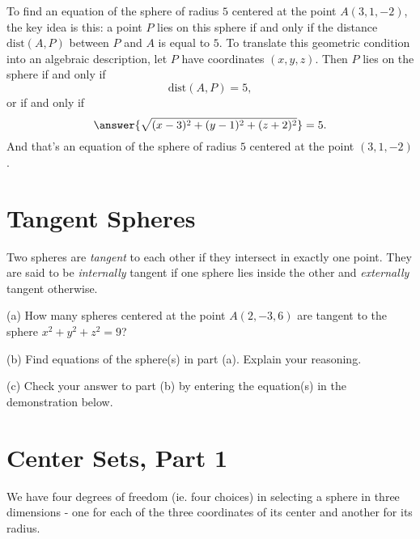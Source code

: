 \documentclass{ximera}
\begin{document}
\begin{question}   \label{QDfsdgfte}
To find an equation of the sphere of radius $5$ centered at the point $A(3,1,-2)$, the key idea is this: a point $P$ lies on this sphere  if and only if the distance $\text{dist}(A,P)$ between $P$ and $A$ is equal to $5$. To translate this geometric condition into an algebraic description, let $P$ have coordinates $(x,y,z)$. Then $P$ lies on the sphere if and only if
\[
   \text{dist}(A,P) = 5 ,
\]
or if and only if 
\[
      \answer{\sqrt{(x-3)^2+ (y-1)^2 + (z+2)^2}} = 5   .
\]
And that's an equation of the sphere of radius $5$ centered at the point $(3,1,-2)$.
\end{question}





\section*{Tangent Spheres}
Two spheres are \emph{tangent} to each other if they intersect in exactly one point. They are said to be \emph{internally} tangent if one sphere lies inside the other and \emph{externally} tangent otherwise.

\begin{question}   \label{Q9sdf43gt4t44}
(a) How many spheres centered at the point $A(2,-3,6)$ are tangent to the sphere $x^2 + y^2 +z^2 = 9$?

(b) Find equations of the sphere(s) in part (a). Explain your reasoning. 

(c) Check your answer to part (b) by entering the equation(s) in the demonstration below.

\begin{exploration}
\begin{onlineOnly}
    \begin{center}
\end{center}
\end{onlineOnly}
\end{exploration}

\end{question}



\section*{Center Sets, Part 1}
We have four degrees of freedom (ie. four choices) in selecting a sphere in three dimensions - one for each of the three coordinates of its center and another for its radius.
\end{document}
